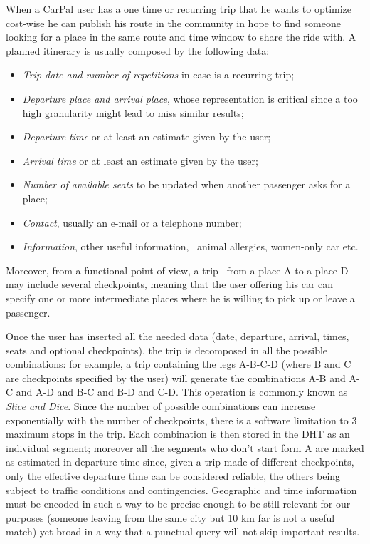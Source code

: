 %
When a CarPal user has a one time or recurring trip that he wants to
optimize cost-wise he can publish his route in the community in hope
to find someone looking for a place in the same route and time window
to share the ride with. A planned itinerary is usually composed by the
following data:
%
\begin{itemize}
\item \emph{Trip date and number of repetitions} in case is a
  recurring trip;
\item \emph{Departure place and arrival place}, whose representation
  is critical since a too high granularity might lead to miss similar
  results;
\item \emph{Departure time} or at least an estimate given by the
  user;
\item \emph{Arrival time} or at least an estimate given by the user;
\item \emph{Number of available seats} to be updated when another
  passenger asks for a place;
\item \emph{Contact}, usually an e-mail or a telephone number;
\item \emph{Information}, other useful information, \ie\ animal
  allergies, women-only car etc.
\end{itemize}
%
Moreover, from a functional point of view, a trip \eg\ from a place A
to a place D may include several checkpoints, meaning that the user
offering his car can specify one or more intermediate places where he
is willing to pick up or leave a passenger.

 Once the user has inserted all the needed data (date, departure,
arrival, times, seats and optional checkpoints), the trip is 
decomposed in all the possible combinations: for example, a trip 
containing the legs A-B-C-D (where B and C are checkpoints specified 
by the user) will generate the combinations A-B and A-C and  
A-D and  B-C and  B-D and  C-D. This
operation is commonly known as \emph{Slice and Dice}.  Since the
number of possible combinations can increase exponentially with the
number of checkpoints, there is a software limitation to 3 maximum
stops in the trip. Each combination is then stored in the DHT as an
individual segment; moreover all the segments who don't start form A
are marked as estimated in departure time since, given a trip made of
different checkpoints, only the effective departure time can be
considered reliable, the others being subject to traffic conditions
and contingencies. Geographic and time information must be encoded in
such a way to be precise enough to be still relevant for our purposes
(someone leaving from the same city but 10 km far is not a useful
match) yet broad in a way that a punctual query will not skip
important results.

